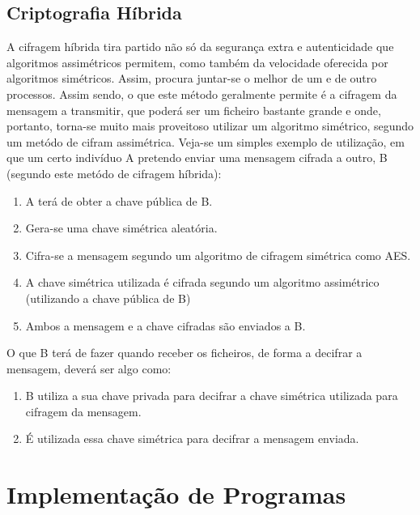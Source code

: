 \documentclass[a4paper,11pt,openright,oneside]{report}
\begin{document}
\section{Criptografia Híbrida}
\label{chap.híbrida}

A cifragem híbrida tira partido não só da segurança extra e autenticidade que algoritmos assimétricos permitem, como também da velocidade oferecida por algoritmos simétricos. Assim, procura juntar-se o melhor de um e de outro processos. Assim sendo, o que este método geralmente permite é a cifragem da mensagem a transmitir, que poderá ser um ficheiro bastante grande e onde, portanto, torna-se muito mais proveitoso utilizar um algoritmo simétrico, segundo um metódo de cifram assimétrica. Veja-se um simples exemplo de utilização, em que um certo indivíduo A pretendo enviar uma mensagem cifrada a outro, B (segundo este metódo de cifragem híbrida):
\begin{enumerate}
\item A terá de obter a chave pública de B.
\item Gera-se uma chave simétrica aleatória.
\item Cifra-se a mensagem segundo um algoritmo de cifragem simétrica como AES.
\item A chave simétrica utilizada é cifrada segundo um algoritmo assimétrico (utilizando a chave pública de B)
\item Ambos a mensagem e a chave cifradas são enviados a B.
\end{enumerate}
O que B terá de fazer quando receber os ficheiros, de forma a decifrar a mensagem, deverá ser algo como:
\begin{enumerate}
\item B utiliza a sua chave privada para decifrar a chave simétrica utilizada para cifragem da mensagem.
\item É utilizada essa chave simétrica para decifrar a mensagem enviada.
\end{enumerate}

\chapter{Implementação de Programas}
\label{chap.programas}
\end{document}
